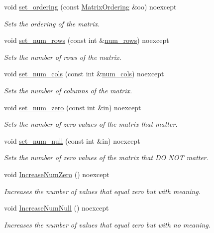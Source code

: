 \begin{DoxyCompactItemize}
void \hyperlink{classmtk_1_1Matrix_a8bdaf3f8307b00a36843359f165e1f17}{set\+\_\+ordering} (const \hyperlink{group__c02-enums_ga622801bd9f912d0f976c3e383f5f581c}{Matrix\+Ordering} \&oo) noexcept
\begin{DoxyCompactList}\small\item\em Sets the ordering of the matrix. \end{DoxyCompactList}\item 
void \hyperlink{classmtk_1_1Matrix_aa4aee0281421c22d9af273b7beb84306}{set\+\_\+num\+\_\+rows} (const int \&\hyperlink{classmtk_1_1Matrix_ab308b25b48e4fcd39fc60e0c3fc66dea}{num\+\_\+rows}) noexcept
\begin{DoxyCompactList}\small\item\em Sets the number of rows of the matrix. \end{DoxyCompactList}\item 
void \hyperlink{classmtk_1_1Matrix_aad6b4ced4a0447cc7bf2347fe86fd722}{set\+\_\+num\+\_\+cols} (const int \&\hyperlink{classmtk_1_1Matrix_a2160118d0edf51cf2aaa806ee1b915f8}{num\+\_\+cols}) noexcept
\begin{DoxyCompactList}\small\item\em Sets the number of columns of the matrix. \end{DoxyCompactList}\item 
void \hyperlink{classmtk_1_1Matrix_a6eb14709692df59573548ffd8cf67198}{set\+\_\+num\+\_\+zero} (const int \&in) noexcept
\begin{DoxyCompactList}\small\item\em Sets the number of zero values of the matrix that matter. \end{DoxyCompactList}\item 
void \hyperlink{classmtk_1_1Matrix_a61dba12c767f98cda5343b4b16bbbe77}{set\+\_\+num\+\_\+null} (const int \&in) noexcept
\begin{DoxyCompactList}\small\item\em Sets the number of zero values of the matrix that D\+O N\+O\+T matter. \end{DoxyCompactList}\item 
void \hyperlink{classmtk_1_1Matrix_ace7cb5c31d0de66b8f9c63cd542c9e63}{Increase\+Num\+Zero} () noexcept
\begin{DoxyCompactList}\small\item\em Increases the number of values that equal zero but with meaning. \end{DoxyCompactList}\item 
void \hyperlink{classmtk_1_1Matrix_af4bba5c43d1f09f5059a04298ba24568}{Increase\+Num\+Null} () noexcept
\begin{DoxyCompactList}\small\item\em Increases the number of values that equal zero but with no meaning. \end{DoxyCompactList}\end{DoxyCompactItemize}
